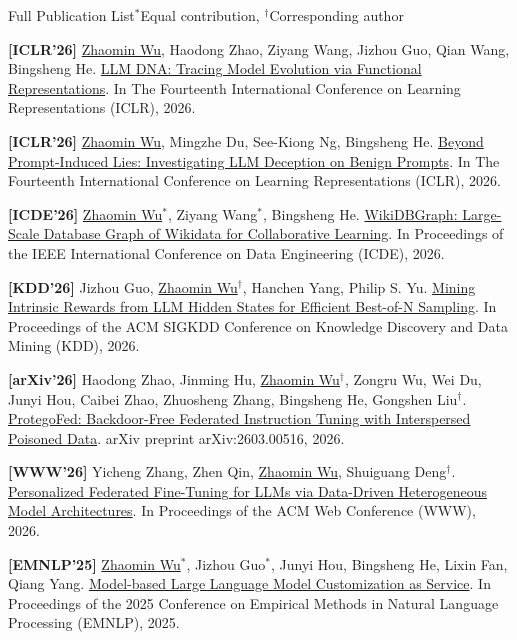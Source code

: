 \begin{rSectionTiny}{Full Publication List}{\(^*\)Equal contribution, \(^\dagger\)Corresponding author}

    {\bf [ICLR'26]} \underline{Zhaomin Wu}, Haodong Zhao, Ziyang Wang, Jizhou Guo, Qian Wang, Bingsheng He. \href{https://openreview.net/forum?id=UIxHaAqFqQ}{LLM DNA: Tracing Model Evolution via Functional Representations}. In The Fourteenth International Conference on Learning Representations (ICLR), 2026. 

    {\bf [ICLR'26]} \underline{Zhaomin Wu}, Mingzhe Du, See-Kiong Ng, Bingsheng He. \href{https://openreview.net/forum?id=PDBBYwd1LY}{Beyond Prompt-Induced Lies: Investigating LLM Deception on Benign Prompts}. In The Fourteenth International Conference on Learning Representations (ICLR), 2026. 

    {\bf [ICDE'26]} \underline{Zhaomin Wu}\(^{*}\), Ziyang Wang\(^{*}\), Bingsheng He. \href{https://arxiv.org/pdf/2505.16635}{WikiDBGraph: Large-Scale Database Graph of Wikidata for Collaborative Learning}. In Proceedings of the IEEE International Conference on Data Engineering (ICDE), 2026.

        {\bf [KDD'26]} Jizhou Guo, \underline{Zhaomin Wu}\(^\dagger\), Hanchen Yang, Philip S. Yu. \href{https://dl.acm.org/doi/10.1145/3770854.3780302}{Mining Intrinsic Rewards from LLM Hidden States for Efficient Best-of-N Sampling}. In Proceedings of the ACM SIGKDD Conference on Knowledge Discovery and Data Mining (KDD), 2026.

        {\bf [arXiv'26]} Haodong Zhao, Jinming Hu, \underline{Zhaomin Wu}\(^\dagger\), Zongru Wu, Wei Du, Junyi Hou, Caibei Zhao, Zhuosheng Zhang, Bingsheng He, Gongshen Liu\(^\dagger\). \href{https://arxiv.org/pdf/2603.00516}{ProtegoFed: Backdoor-Free Federated Instruction Tuning with Interspersed Poisoned Data}. arXiv preprint arXiv:2603.00516, 2026.

        {\bf [WWW'26]} Yicheng Zhang, Zhen Qin, \underline{Zhaomin Wu}, Shuiguang Deng\(^\dagger\). \href{https://dl.acm.org/doi/10.1145/3774904.3792147}{Personalized Federated Fine-Tuning for LLMs via Data-Driven Heterogeneous Model Architectures}. In Proceedings of the ACM Web Conference (WWW), 2026. 


    {\bf [EMNLP'25]} \underline{Zhaomin Wu}\(^{*}\), Jizhou Guo\(^{*}\), Junyi Hou, Bingsheng He, Lixin Fan, Qiang Yang. \href{https://aclanthology.org/2025.emnlp-main.248.pdf}{Model-based Large Language Model Customization as Service}. In Proceedings of the 2025 Conference on Empirical Methods in Natural Language Processing (EMNLP), 2025.


\end{rSectionTiny}
